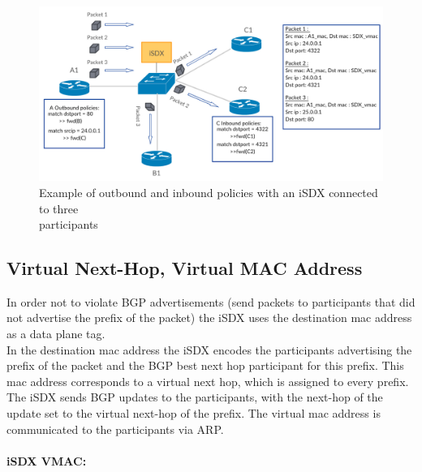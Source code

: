 \begin{figure}[h]
\includegraphics[scale = 0.32]{Figures/bckgrnd_sdx_policies.pdf}
\caption{Example of outbound and inbound policies with an iSDX connected to three \\ participants}
\end{figure}


\subsection{\label{chapter2:iSDX:virtual next-hop, virtual mac address}Virtual Next-Hop, Virtual MAC Address}

In order not to violate BGP advertisements (send packets to participants that did not advertise the prefix of the packet) the iSDX uses the destination mac address as a data plane tag. \\ 
In the destination mac address the iSDX encodes the participants advertising the prefix of the packet and the BGP best next hop participant for this prefix. This mac address corresponds to a virtual next hop, which is assigned to every prefix. \\ The iSDX sends BGP updates to the participants, with the next-hop of the update set to the virtual next-hop of the prefix. The virtual mac address is communicated to the participants via ARP.
\paragraph{\label{chapter2:iSDX:virtual next-hop :inbound policies}iSDX VMAC:}

